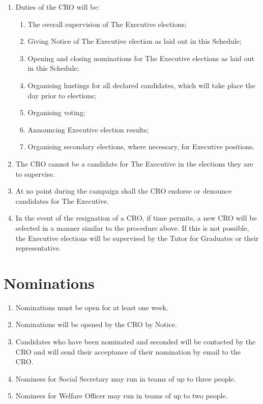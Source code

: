 \documentclass[11pt, a4paper]{article}
\begin{document}
\begin{enumerate}
    \item Duties of the CRO will be:
    \begin{enumerate}
        \item The overall supervision of The Executive elections;
        \item Giving Notice of The Executive election as laid out in this Schedule;
        \item Opening and closing nominations for The Executive elections as laid out in this Schedule;
        \item Organising hustings for all declared candidates, which will take place the day prior to elections;
        \item Organising voting;
        \item Announcing Executive election results;
        \item Organising secondary elections, where necessary, for Executive positions.
    \end{enumerate}
    \item The CRO cannot be a candidate for The Executive in the elections they are to supervise.
    \item At no point during the campaign shall the CRO endorse or denounce candidates for The Executive.
    \item In the event of the resignation of a CRO, if time permits, a new CRO will be selected in a manner similar to the procedure above. If this is not possible, the  Executive elections will be supervised by the Tutor for Graduates or their representative.
\end{enumerate}





\section{Nominations}
\label{sec:nominations}

\begin{enumerate}
    \item Nominations must be open for at least one week.
    \item Nominations will be opened by the CRO  by Notice.
    \item Candidates who have been nominated and seconded will be contacted by the CRO and will send their acceptance of their nomination by email to the CRO.
    \item Nominees for Social Secretary may run in teams of up to three people.
    \item Nominees for Welfare Officer may run in teams of up to two people.
\end{enumerate}
\end{document}

